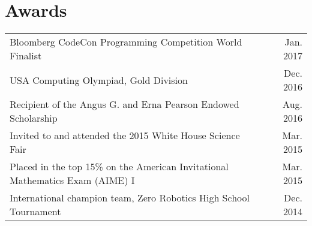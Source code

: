 \documentclass[9pt]{extarticle}
\begin{document}
\section*{Awards}
\begin{tabularx}{\textwidth}{X r }
    Bloomberg CodeCon Programming Competition World Finalist & Jan. 2017 \\
    USA Computing Olympiad, Gold Division & Dec. 2016 \\
    Recipient of the Angus G. and Erna Pearson Endowed Scholarship & Aug. 2016 \\
    Invited to and attended the 2015 White House Science Fair & Mar. 2015 \\
    Placed in the top 15\% on the American Invitational Mathematics Exam (AIME) I & Mar. 2015 \\
    International champion team, Zero Robotics High School Tournament & Dec. 2014 \\
\end{tabularx}
\end{document}
